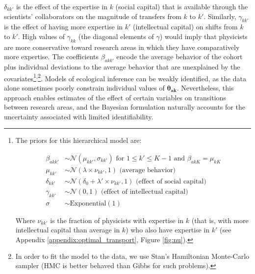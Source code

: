 \documentclass{article}
\begin{document}
$\delta_{kk'}$ is the effect of the expertise in $k$ (social capital) that is available through the scientists' collaborators on the magnitude of transfers from $k$ to $k'$. Similarly, $\gamma_{kk'}$ is the effect of having more expertise in $k'$ (intellectual capital) on shifts from $k$ to $k'$. High values of $\gamma_{kk}$ (the diagonal elements of $\gamma$) would imply that physicists are more conservative toward research areas in which they have comparatively more expertise. The coefficients $\beta_{akk'}$ encode the average behavior of the cohort plus individual deviations to the average behavior that are unexplained by the covariates\footnote{The priors for this hierarchical model are:

\begin{align}
    \beta_{akk'} &\sim \mathcal{N}(\mu_{k k'},\sigma_{k k'}) \text{ for } 1\leq k' \leq K-1 \text{ and } \beta_{ak K} = \mu_{kK}\\
    \mu_{k k'} &\sim \mathcal{N}(\lambda \times  \nu_{kk'},1) \text{ (average behavior)}\\
    \delta_{kk'} &\sim \mathcal{N}(\delta_0+\lambda ' \times \nu_{kk'},1) \text { (effect of social capital)}\\
    \gamma_{kk'} &\sim \mathcal{N}(0,1)  \text { (effect of intellectual capital)}\\
    \sigma &\sim \mathrm{Exponential}(1)
\end{align}

Where $\nu_{kk'}$ is the fraction of physicists with expertise in $k$ (that is, with more intellectual capital than average in $k$) who also have expertise in $k'$ (see Appendix \ref{appendix:optimal_transport}, Figure \ref{fig:nu}). 
}\textsuperscript{,}\footnote{In order to fit the model to the data, we use Stan's Hamiltonian Monte-Carlo sampler (HMC is better behaved than Gibbs for such problems).%
}. %
Models of ecological inference can be weakly identified, as the data alone sometimes poorly constrain individual values of $\bm{\theta_{ak}}$.  %
Nevertheless, this approach enables estimates of the effect of certain variables on transitions between research areas, and the Bayesian formulation naturally accounts for the uncertainty associated with limited identifiability.
\end{document}
